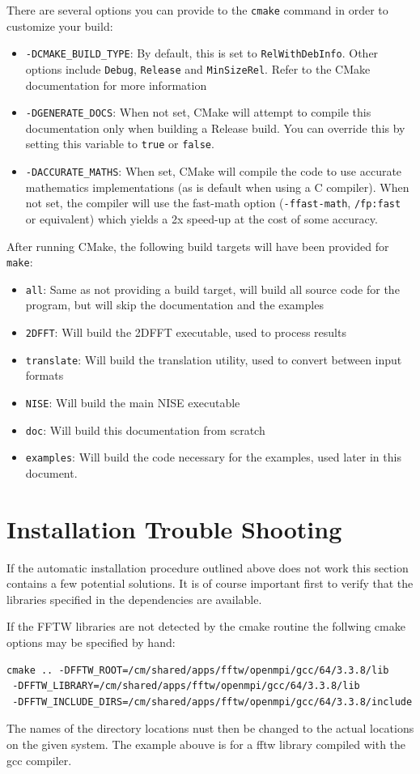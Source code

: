 \documentclass[12pt]{book}
\begin{document}
There are several options you can provide to the {\tt cmake} command in order to customize your build:
\begin{itemize}
\item {\tt -DCMAKE\_BUILD\_TYPE}: By default, this is set to {\tt RelWithDebInfo}. Other options include {\tt Debug}, {\tt Release} and {\tt MinSizeRel}. Refer to the CMake documentation for more information
\item {\tt -DGENERATE\_DOCS}: When not set, CMake will attempt to compile this documentation only when building a Release build. You can override this by setting this variable to {\tt true} or {\tt false}.
\item {\tt -DACCURATE\_MATHS}: When set, CMake will compile the code to use accurate mathematics implementations (as is default when using a C compiler). When not set, the compiler will use the fast-math option ({\tt -ffast-math}, {\tt /fp:fast} or equivalent) which yields a 2x speed-up at the cost of some accuracy.
\end{itemize}

After running CMake, the following build targets will have been provided for {\tt make}:
\begin{itemize}
\item {\tt all}: Same as not providing a build target, will build all source code for the program, but will skip the documentation and the examples
\item {\tt 2DFFT}: Will build the 2DFFT executable, used to process results
\item {\tt translate}: Will build the translation utility, used to convert between input formats
\item {\tt NISE}: Will build the main NISE executable
\item {\tt doc}: Will build this documentation from scratch
\item {\tt examples}: Will build the code necessary for the examples, used later in this document.
\end{itemize}

\section{Installation Trouble Shooting}
If the automatic installation procedure outlined above does not work this section contains a few potential solutions. It is of course important first to verify that the libraries specified in the dependencies are available.

If the FFTW libraries are not detected by the cmake routine the follwing cmake options may be specified by hand:
\begin{verbatim}
cmake .. -DFFTW_ROOT=/cm/shared/apps/fftw/openmpi/gcc/64/3.3.8/lib
 -DFFTW_LIBRARY=/cm/shared/apps/fftw/openmpi/gcc/64/3.3.8/lib
 -DFFTW_INCLUDE_DIRS=/cm/shared/apps/fftw/openmpi/gcc/64/3.3.8/include
\end{verbatim}
The names of the directory locations nust then be changed to the actual locations on the given system.  The example abouve is for a fftw library compiled with the gcc compiler.
\end{document}
